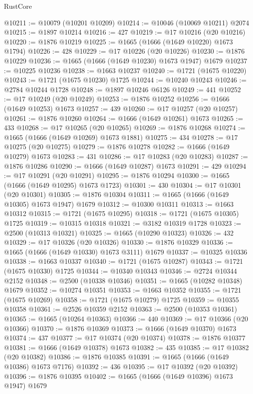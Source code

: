 \begin{lexlean}{RustCore}
\begin{coremodule}
@10211 := @10079 (@10201 @10209)
@10214 := @10046 (@10069 @10211) @2074
@10215 := @1897 @10214
@10216 := 427
@10219 := @17 @10216 (@20 @10216)
@10220 := @1876 @10219
@10225 := @1665 (@1666 (@1649 @10220) @1673 @1794)
@10226 := 428
@10229 := @17 @10226 (@20 @10226)
@10230 := @1876 @10229
@10236 := @1665 (@1666 (@1649 @10230) @1673 @1947) @1679
@10237 := @10225 @10236
@10238 := @1663 @10237
@10240 := @1721 (@1675 @10220)
@10243 := @1721 (@1675 @10230) @1725
@10244 := @10240 @10243
@10246 := @2784 @10244 @1728
@10248 := @1897 @10246 @6126
@10249 := 441
@10252 := @17 @10249 (@20 @10249)
@10253 := @1876 @10252
@10256 := @1666 (@1649 @10253) @1673
@10257 := 439
@10260 := @17 @10257 (@20 @10257)
@10261 := @1876 @10260
@10264 := @1666 (@1649 @10261) @1673
@10265 := 433
@10268 := @17 @10265 (@20 @10265)
@10269 := @1876 @10268
@10274 := @1665 (@1666 (@1649 @10269) @1673 @1881)
@10275 := 434
@10278 := @17 @10275 (@20 @10275)
@10279 := @1876 @10278
@10282 := @1666 (@1649 @10279) @1673
@10283 := 431
@10286 := @17 @10283 (@20 @10283)
@10287 := @1876 @10286
@10290 := @1666 (@1649 @10287) @1673
@10291 := 429
@10294 := @17 @10291 (@20 @10291)
@10295 := @1876 @10294
@10300 := @1665 (@1666 (@1649 @10295) @1673 @1723)
@10301 := 430
@10304 := @17 @10301 (@20 @10301)
@10305 := @1876 @10304
@10311 := @1665 (@1666 (@1649 @10305) @1673 @1947) @1679
@10312 := @10300 @10311
@10313 := @1663 @10312
@10315 := @1721 (@1675 @10295)
@10318 := @1721 (@1675 @10305) @1725
@10319 := @10315 @10318
@10321 := @3182 @10319 @1728
@10323 := @2500 (@10313 @10321)
@10325 := @1665 (@10290 @10323)
@10326 := 432
@10329 := @17 @10326 (@20 @10326)
@10330 := @1876 @10329
@10336 := @1665 (@1666 (@1649 @10330) @1673 @3111) @1679
@10337 := @10325 @10336
@10338 := @1663 @10337
@10340 := @1721 (@1675 @10287)
@10343 := @1721 (@1675 @10330) @1725
@10344 := @10340 @10343
@10346 := @2724 @10344 @2152
@10348 := @2500 (@10338 @10346)
@10351 := @1665 (@10282 @10348) @1679
@10352 := @10274 @10351
@10353 := @1663 @10352
@10355 := @1721 (@1675 @10269)
@10358 := @1721 (@1675 @10279) @1725
@10359 := @10355 @10358
@10361 := @2526 @10359 @2152
@10363 := @2500 (@10353 @10361)
@10365 := @1665 (@10264 @10363)
@10366 := 440
@10369 := @17 @10366 (@20 @10366)
@10370 := @1876 @10369
@10373 := @1666 (@1649 @10370) @1673
@10374 := 437
@10377 := @17 @10374 (@20 @10374)
@10378 := @1876 @10377
@10381 := @1666 (@1649 @10378) @1673
@10382 := 435
@10385 := @17 @10382 (@20 @10382)
@10386 := @1876 @10385
@10391 := @1665 (@1666 (@1649 @10386) @1673 @7176)
@10392 := 436
@10395 := @17 @10392 (@20 @10392)
@10396 := @1876 @10395
@10402 := @1665 (@1666 (@1649 @10396) @1673 @1947) @1679

\end{coremodule}
\end{lexlean}
